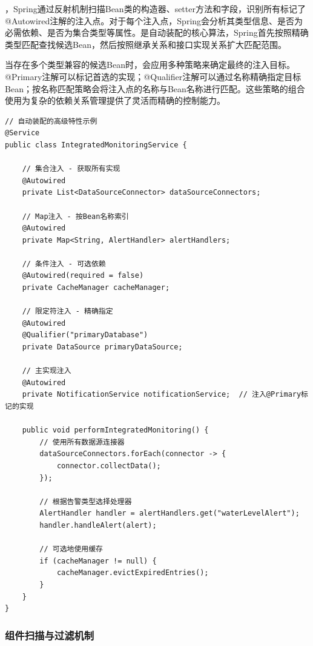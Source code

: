 ，Spring通过反射机制扫描Bean类的构造器、setter方法和字段，识别所有标记了@Autowired注解的注入点。对于每个注入点，Spring会分析其类型信息、是否为必需依赖、是否为集合类型等属性。是自动装配的核心算法，Spring首先按照精确类型匹配查找候选Bean，然后按照继承关系和接口实现关系扩大匹配范围。

当存在多个类型兼容的候选Bean时，会应用多种策略来确定最终的注入目标。@Primary注解可以标记首选的实现；@Qualifier注解可以通过名称精确指定目标Bean；按名称匹配策略会将注入点的名称与Bean名称进行匹配。这些策略的组合使用为复杂的依赖关系管理提供了灵活而精确的控制能力。

\begin{lstlisting}[style=java]
// 自动装配的高级特性示例
@Service
public class IntegratedMonitoringService {
    
    // 集合注入 - 获取所有实现
    @Autowired
    private List<DataSourceConnector> dataSourceConnectors;
    
    // Map注入 - 按Bean名称索引
    @Autowired
    private Map<String, AlertHandler> alertHandlers;
    
    // 条件注入 - 可选依赖
    @Autowired(required = false)
    private CacheManager cacheManager;
    
    // 限定符注入 - 精确指定
    @Autowired
    @Qualifier("primaryDatabase")
    private DataSource primaryDataSource;
    
    // 主实现注入
    @Autowired
    private NotificationService notificationService;  // 注入@Primary标记的实现
    
    public void performIntegratedMonitoring() {
        // 使用所有数据源连接器
        dataSourceConnectors.forEach(connector -> {
            connector.collectData();
        });
        
        // 根据告警类型选择处理器
        AlertHandler handler = alertHandlers.get("waterLevelAlert");
        handler.handleAlert(alert);
        
        // 可选地使用缓存
        if (cacheManager != null) {
            cacheManager.evictExpiredEntries();
        }
    }
}
\end{lstlisting}

\hypertarget{ux7ec4ux4ef6ux626bux63cfux4e0eux8fc7ux6ee4ux673aux5236}{%
\subsubsection{组件扫描与过滤机制}\label{ux7ec4ux4ef6ux626bux63cfux4e0eux8fc7ux6ee4ux673aux5236}}

